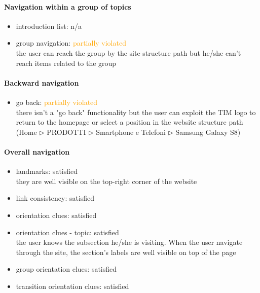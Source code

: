 \begin{enumerate}
	\paragraph*{Navigation within a group of topics}
	\begin{itemize}
		\item introduction list: n/a
		\item group navigation: \textcolor{orange}{partially violated}\\
		the user can reach the group by the site structure path but he/she can't reach items related to the group
	\end{itemize}

	\paragraph*{Backward navigation}
	\begin{itemize}
		\item go back: \textcolor{orange}{partially violated}\\
		there isn't a "go back" functionality but the user can exploit the TIM logo to return to the homepage or select a position in the website structure path (Home $\triangleright$ PRODOTTI $\triangleright$ Smartphone e Telefoni $\triangleright$ Samsung Galaxy S8)
	\end{itemize}

	\paragraph*{Overall navigation}
	\begin{itemize}
		\item landmarks: satisfied\\
		they are well visible on the top-right corner of the website
		\item link consistency: satisfied
		\item orientation clues: satisfied
		\item orientation clues - topic: satisfied\\
		the user knows the subsection he/she is visiting. When the user navigate through the site, the section's labels are well visible on top of the page
		\item group orientation clues: satisfied
		\item transition orientation clues: satisfied
	\end{itemize}	


\end{enumerate}
